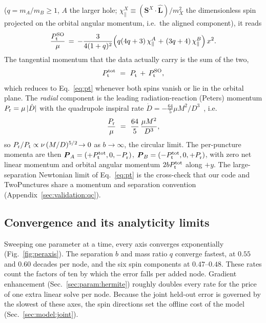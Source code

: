 \documentclass[
  aps,
  prd,
  twocolumn,
  10pt,
  amsmath,
  amssymb,
  nofootinbib,
  superscriptaddress,
  floatfix,
]{revtex4-2}
\newcommand{\vect}[1]{\boldsymbol{#1}}
\newif\ifshownew \shownewtrue
\newcommand{\newtextbegin}{\ifshownew\color{red}\fi}
\newcommand{\newtextend}{\ifshownew\color{black}\fi}
\begin{document}
($q=m_A/m_B\ge1$, $A$ the larger hole; $\chi^{X}_{\parallel} \equiv (\vect{S}^{X}\!\cdot\!\hat{\vect{L}})/m_X^2$
the dimensionless spin projected on the orbital angular momentum, i.e.\ the aligned component), it reads
\newtextbegin \begin{equation}
  \frac{P_{\rm t}^{\rm SO}}{\mu} \, = \, -\frac{3}{4(1+q)^2}\Bigl(q(4q+3)\,\chi^{A}_{\parallel} \hspace{0.07em} + \hspace{0.07em} (3q+4)\,\chi^{B}_{\parallel}\Bigr)\,x^2 .
  \label{eq:ptso}
\end{equation}\newtextend
The tangential momentum that the data actually carry is the sum of the two,
\begin{equation}
  P_{\rm t}^{\rm tot} \ = \ P_{\rm t}^{\vphantom{\rm tot}} \, + \, P_{\rm t}^{\rm SO},
  \label{eq:pttot}
\end{equation}
which reduces to Eq.~\eqref{eq:pt} whenever both spins vanish or lie in the orbital plane.
The \emph{radial} component is the leading radiation-reaction (Peters) momentum
$P_{\rm r}=\mu\,|\dot D|$ with the quadrupole inspiral rate
$\dot D=-\tfrac{64}{5}\mu M^2/D^3$~\cite{Peters1964,Walther2009}, i.e.
\begin{equation}
  \frac{P_{\rm r}}{\mu} \ = \ \frac{64}{5}\,\frac{\mu M^2}{D^3},
  \label{eq:pr}
\end{equation}
so $P_{\rm r}/P_{\rm t}\propto\nu\,(M/D)^{5/2}\!\to0$ as $b\to\infty$, the circular limit.
The per-puncture momenta are then $\vect{P}_A=(+P_{\rm t}^{\rm tot},0,-P_{\rm r}^{\vphantom{\rm tot}})$,
$\vect{P}_B=(-P_{\rm t}^{\rm tot},0,+P_{\rm r}^{\vphantom{\rm tot}})$, with zero net linear momentum and orbital angular
momentum $2bP_{\rm t}^{\rm tot}$ along $+y$.
The large-separation Newtonian limit of Eq.~\eqref{eq:pt} is the cross-check that our code and Two\-Punctures share a momentum and separation convention (Appendix~\ref{sec:validation:qc}).


\subsection{Convergence and its analyticity limits}
\label{sec:model:peraxis}
\label{sec:model:walls}
Sweeping one parameter at a time, every axis converges exponentially
(Fig.~\ref{fig:peraxis}). The separation $b$ and mass ratio $q$ converge fastest, at $0.55$ and $0.60$ decades per node, and the six spin components at $0.47$--$0.48$.
These rates count the factors of ten by which the error falls per added node.
Gradient enhancement (Sec.~\ref{sec:param:hermite}) roughly doubles every
rate for the price of one extra linear solve per node.
Because the joint held-out error is governed by the slowest of these axes, the spin directions set the offline cost of the model (Sec.~\ref{sec:model:joint}).
\end{document}
